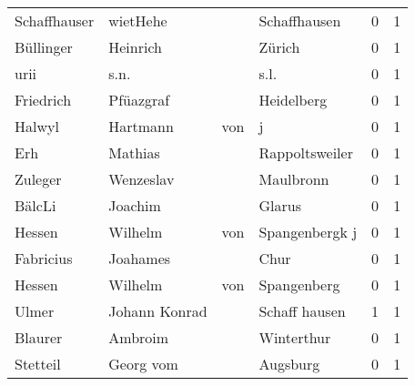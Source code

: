 \documentclass[10pt,a4paper,landscape]{article}
\begin{document}
\begin{longtable}{llllrr}
             Schaffhauser &                           wietHehe &             &                                Schaffhausen &          0 &         1 \\
                Büllinger &                           Heinrich &             &                                      Zürich &          0 &         1 \\
                     urii &                               s.n. &             &                                        s.l. &          0 &         1 \\
                Friedrich &                          Pfüazgraf &             &                                  Heidelberg &          0 &         1 \\
                   Halwyl &                           Hartmann &         von &                                           j &          0 &         1 \\
                      Erh &                            Mathias &             &                              Rappoltsweiler &          0 &         1 \\
                  Zuleger &                          Wenzeslav &             &                                   Maulbronn &          0 &         1 \\
                   BälcLi &                            Joachim &             &                                      Glarus &          0 &         1 \\
                   Hessen &                            Wilhelm &         von &                              Spangenbergk j &          0 &         1 \\
                Fabricius &                           Joahames &             &                                        Chur &          0 &         1 \\
                   Hessen &                            Wilhelm &         von &                                 Spangenberg &          0 &         1 \\
                    Ulmer &                      Johann Konrad &             &                               Schaff hausen &          1 &         1 \\
                  Blaurer &                            Ambroim &             &                                  Winterthur &          0 &         1 \\
                 Stetteil &                          Georg vom &             &                                    Augsburg &          0 &         1 \\

\end{longtable}
\end{document}
